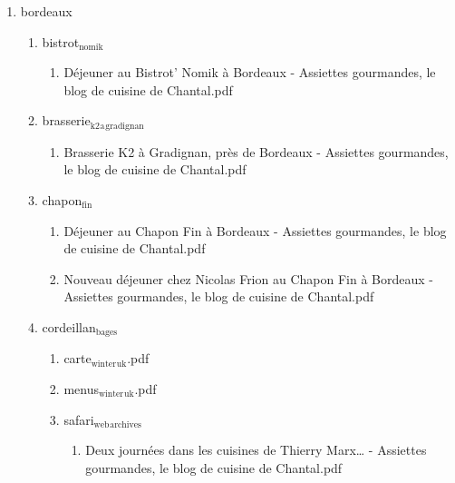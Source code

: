 \documentclass[11pt]{article}
\begin{document}
\begin{enumerate}
\begin{enumerate}
\item bordeaux
\label{sec-1-1-1-1-21-10-3-2}
\begin{enumerate}
\item bistrot$_{\text{nomik}}$
\label{sec-1-1-1-1-21-10-3-2-1}
\begin{enumerate}
\item Déjeuner au Bistrot' Nomik à Bordeaux - Assiettes gourmandes, le blog de cuisine de Chantal.pdf
\label{sec-1-1-1-1-21-10-3-2-1-1}
\end{enumerate}

\item brasserie$_{\text{k2}}$$_{\text{a}}$$_{\text{gradignan}}$
\label{sec-1-1-1-1-21-10-3-2-2}
\begin{enumerate}
\item Brasserie K2 à Gradignan, près de Bordeaux - Assiettes gourmandes, le blog de cuisine de Chantal.pdf
\label{sec-1-1-1-1-21-10-3-2-2-1}
\end{enumerate}

\item chapon$_{\text{fin}}$
\label{sec-1-1-1-1-21-10-3-2-3}
\begin{enumerate}
\item Déjeuner au Chapon Fin à Bordeaux - Assiettes gourmandes, le blog de cuisine de Chantal.pdf
\label{sec-1-1-1-1-21-10-3-2-3-1}

\item Nouveau déjeuner chez Nicolas Frion au Chapon Fin à Bordeaux - Assiettes gourmandes, le blog de cuisine de Chantal.pdf
\label{sec-1-1-1-1-21-10-3-2-3-2}
\end{enumerate}

\item cordeillan$_{\text{bages}}$
\label{sec-1-1-1-1-21-10-3-2-4}
\begin{enumerate}
\item carte$_{\text{winter}}$$_{\text{uk}}$.pdf
\label{sec-1-1-1-1-21-10-3-2-4-1}

\item menus$_{\text{winter}}$$_{\text{uk}}$.pdf
\label{sec-1-1-1-1-21-10-3-2-4-2}

\item safari$_{\text{web}}$$_{\text{archives}}$
\label{sec-1-1-1-1-21-10-3-2-4-3}
\begin{enumerate}
\item Deux journées dans les cuisines de Thierry Marx\ldots{} - Assiettes gourmandes, le blog de cuisine de Chantal.pdf
\label{sec-1-1-1-1-21-10-3-2-4-3-1}
\end{enumerate}
\end{enumerate}


\end{enumerate}
\end{enumerate}
\end{enumerate}
\end{document}
